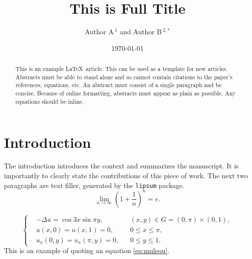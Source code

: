 \documentclass[10pt,reqno,final]{amsart}
\title[Short Title]{This is Full Title}
\author[Author A \; \& \; Author B]{Author A${\,}^{1}$ \quad and \quad Author B${\,}^{2,*}$} %
\date{\today}
\numberwithin{equation}{section}
\numberwithin{figure}{section}
\numberwithin{table}{section}
\theoremstyle{plain}
\theoremstyle{definition}
\theoremstyle{remark}
\begin{document}
\begin{abstract}
  This is an example \LaTeX\ article. This can be used as a
  template for new articles.  Abstracts must be able to stand alone
  and so cannot contain citations to the paper's references,
  equations, etc.  An abstract must consist of a single paragraph and
  be concise. Because of online formatting, abstracts must appear as
  plain as possible. Any equations should be inline.
\end{abstract}

\maketitle


\section{Introduction}
The introduction introduces the context and summarizes the
manuscript. It is importantly to clearly state the contributions of
this piece of work. The next two paragraphs are text filler,
generated by the \texttt{lipsum} package.
\begin{equation}\label{eq:limite}
  \lim_{n\to\infty}\left(1+\frac{1}{n}\right)^n=e.
\end{equation}

\lipsum[2]

\begin{equation}\label{eq:mulequ}
\left\{\begin{aligned}
&-\Delta u=\cos 3x \sin \pi y, && (x, y) \in G=(0, \pi) \times(0,1), \\
&u(x, 0)=u(x, 1)=0, && 0 \leqslant x \leqslant \pi, \\
&u_{x}(0, y)=u_{x}(\pi, y)=0, && 0 \leqslant y \leqslant 1.
\end{aligned}\right.
\end{equation}
This is an example of quoting an equation \eqref{eq:mulequ}.

\end{document}
